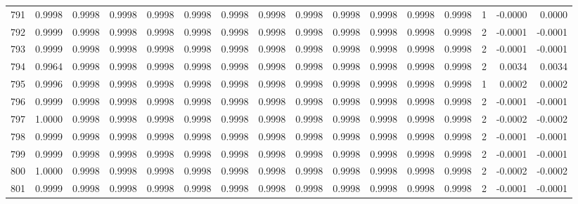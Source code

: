 \begin{tabular}{lrrrrrrrrrrrrrrr}
791 &      0.9998 &  0.9998 &  0.9998 &  0.9998 &  0.9998 &  0.9998 &  0.9998 &  0.9998 &  0.9998 &  0.9998 &   0.9998 &     0.9998 &      1 &                   -0.0000 &                     0.0000 \\
792 &      0.9999 &  0.9998 &  0.9998 &  0.9998 &  0.9998 &  0.9998 &  0.9998 &  0.9998 &  0.9998 &  0.9998 &   0.9998 &     0.9998 &      2 &                   -0.0001 &                    -0.0001 \\
793 &      0.9999 &  0.9998 &  0.9998 &  0.9998 &  0.9998 &  0.9998 &  0.9998 &  0.9998 &  0.9998 &  0.9998 &   0.9998 &     0.9998 &      2 &                   -0.0001 &                    -0.0001 \\
794 &      0.9964 &  0.9998 &  0.9998 &  0.9998 &  0.9998 &  0.9998 &  0.9998 &  0.9998 &  0.9998 &  0.9998 &   0.9998 &     0.9998 &      2 &                    0.0034 &                     0.0034 \\
795 &      0.9996 &  0.9998 &  0.9998 &  0.9998 &  0.9998 &  0.9998 &  0.9998 &  0.9998 &  0.9998 &  0.9998 &   0.9998 &     0.9998 &      1 &                    0.0002 &                     0.0002 \\
796 &      0.9999 &  0.9998 &  0.9998 &  0.9998 &  0.9998 &  0.9998 &  0.9998 &  0.9998 &  0.9998 &  0.9998 &   0.9998 &     0.9998 &      2 &                   -0.0001 &                    -0.0001 \\
797 &      1.0000 &  0.9998 &  0.9998 &  0.9998 &  0.9998 &  0.9998 &  0.9998 &  0.9998 &  0.9998 &  0.9998 &   0.9998 &     0.9998 &      2 &                   -0.0002 &                    -0.0002 \\
798 &      0.9999 &  0.9998 &  0.9998 &  0.9998 &  0.9998 &  0.9998 &  0.9998 &  0.9998 &  0.9998 &  0.9998 &   0.9998 &     0.9998 &      2 &                   -0.0001 &                    -0.0001 \\
799 &      0.9999 &  0.9998 &  0.9998 &  0.9998 &  0.9998 &  0.9998 &  0.9998 &  0.9998 &  0.9998 &  0.9998 &   0.9998 &     0.9998 &      2 &                   -0.0001 &                    -0.0001 \\
800 &      1.0000 &  0.9998 &  0.9998 &  0.9998 &  0.9998 &  0.9998 &  0.9998 &  0.9998 &  0.9998 &  0.9998 &   0.9998 &     0.9998 &      2 &                   -0.0002 &                    -0.0002 \\
801 &      0.9999 &  0.9998 &  0.9998 &  0.9998 &  0.9998 &  0.9998 &  0.9998 &  0.9998 &  0.9998 &  0.9998 &   0.9998 &     0.9998 &      2 &                   -0.0001 &                    -0.0001 \\

\end{tabular}
